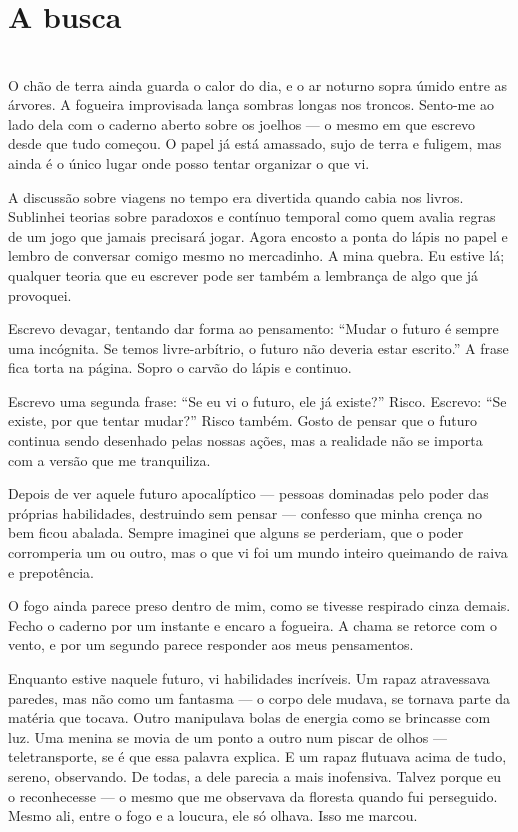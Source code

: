 \newpage

\ifdefined\useChapters
\chapter{A busca}
\else
\chapter{}
\fi

O chão de terra ainda guarda o calor do dia, e o ar noturno sopra úmido entre as árvores. A fogueira improvisada lança sombras longas nos troncos. Sento-me ao lado dela com o caderno aberto sobre os joelhos — o mesmo em que escrevo desde que tudo começou. O papel já está amassado, sujo de terra e fuligem, mas ainda é o único lugar onde posso tentar organizar o que vi.

A discussão sobre viagens no tempo era divertida quando cabia nos livros. Sublinhei teorias sobre paradoxos e contínuo temporal como quem avalia regras de um jogo que jamais precisará jogar. Agora encosto a ponta do lápis no papel e lembro de conversar comigo mesmo no mercadinho. A mina quebra. Eu estive lá; qualquer teoria que eu escrever pode ser também a lembrança de algo que já provoquei.

Escrevo devagar, tentando dar forma ao pensamento:  
“Mudar o futuro é sempre uma incógnita. Se temos livre-arbítrio, o futuro não deveria estar escrito.”  
A frase fica torta na página. Sopro o carvão do lápis e continuo.  

Escrevo uma segunda frase: “Se eu vi o futuro, ele já existe?” Risco. Escrevo: “Se existe, por que tentar mudar?” Risco também. Gosto de pensar que o futuro continua sendo desenhado pelas nossas ações, mas a realidade não se importa com a versão que me tranquiliza.

Depois de ver aquele futuro apocalíptico — pessoas dominadas pelo poder das próprias habilidades, destruindo sem pensar — confesso que minha crença no bem ficou abalada. Sempre imaginei que alguns se perderiam, que o poder corromperia um ou outro, mas o que vi foi um mundo inteiro queimando de raiva e prepotência.  

O fogo ainda parece preso dentro de mim, como se tivesse respirado cinza demais.  
Fecho o caderno por um instante e encaro a fogueira. A chama se retorce com o vento, e por um segundo parece responder aos meus pensamentos. 

Enquanto estive naquele futuro, vi habilidades incríveis.  
Um rapaz atravessava paredes, mas não como um fantasma — o corpo dele mudava, se tornava parte da matéria que tocava.  
Outro manipulava bolas de energia como se brincasse com luz.  
Uma menina se movia de um ponto a outro num piscar de olhos — teletransporte, se é que essa palavra explica.  
E um rapaz flutuava acima de tudo, sereno, observando.  
De todas, a dele parecia a mais inofensiva. Talvez porque eu o reconhecesse — o mesmo que me observava da floresta quando fui perseguido.  
Mesmo ali, entre o fogo e a loucura, ele só olhava.  
Isso me marcou.  

